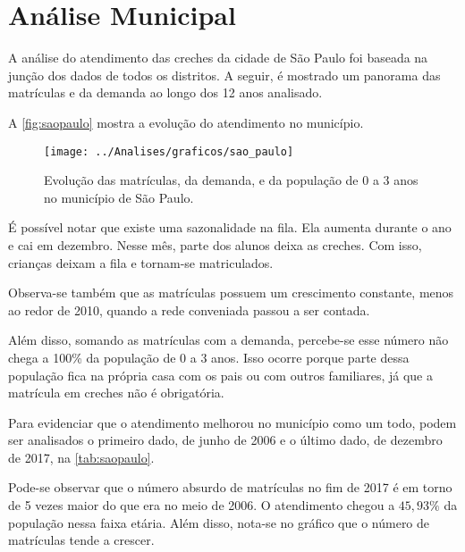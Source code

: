 \chapter{Análise Municipal}
\label{cap:sp}

\lettrine{A}{} análise do atendimento das creches da cidade de São Paulo foi baseada na junção dos dados de todos os distritos. A seguir, é mostrado um panorama das matrículas e da demanda ao longo dos 12 anos analisado.

A \autoref{fig:saopaulo} mostra a evolução do atendimento no município.

\begin{figure}[H]
	\centering
	\texttt{[image: ../Analises/graficos/sao\_paulo]}
	\caption{Evolução das matrículas, da demanda, e da população de 0 a 3 anos no município de São Paulo.}
	\label{fig:saopaulo}
\end{figure}

É possível notar que existe uma sazonalidade na fila. Ela aumenta durante o ano e cai em dezembro. Nesse mês, parte dos alunos deixa as creches. Com isso, crianças deixam a fila e tornam-se matriculados.

Observa-se também que as matrículas possuem um crescimento constante, menos ao redor de 2010, quando a rede conveniada passou a ser contada. 

Além disso, somando as matrículas com a demanda, percebe-se esse número não chega a 100\% da população de 0 a 3 anos. Isso ocorre porque parte dessa população fica na própria casa com os pais ou com outros familiares, já que a matrícula em creches não é obrigatória.

Para evidenciar que o atendimento melhorou no município como um todo, podem ser analisados o primeiro dado, de junho de 2006 e o último dado, de dezembro de 2017, na \autoref{tab:saopaulo}.

Pode-se observar que o número absurdo de matrículas no fim de 2017 é em torno de 5 vezes maior do que era no meio de 2006. O atendimento chegou a $ 45,93\% $ da população nessa faixa etária. Além disso, nota-se no gráfico que o número de matrículas tende a crescer.

